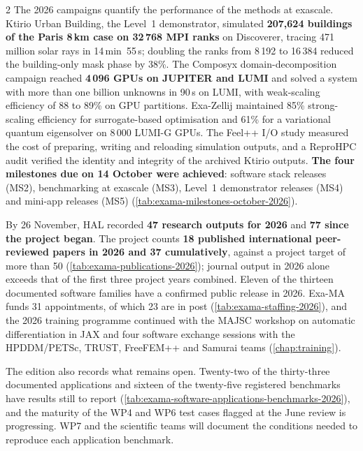 \begin{multicols}{2}
The 2026 campaigns quantify the performance of the methods at
exascale. Ktirio Urban Building, the Level~1 demonstrator, simulated
\textbf{207,624 buildings of the Paris 8\,km case on 32\,768 MPI
ranks} on Discoverer, tracing 471 million solar rays in 14\,min~55\,s;
doubling the ranks from 8\,192 to 16\,384 reduced the building-only
mask phase by 38\%. The Composyx domain-decomposition campaign
reached \textbf{4\,096 GPUs on JUPITER and LUMI} and solved a system
with more than one billion unknowns in 90\,s on LUMI, with
weak-scaling efficiency of 88 to 89\% on GPU partitions. Exa-Zellij
maintained 85\% strong-scaling efficiency for surrogate-based
optimisation and 61\% for a variational quantum eigensolver on
8\,000 LUMI-G GPUs. The Feel++ I/O study measured the cost of
preparing, writing and reloading simulation outputs, and a ReproHPC
audit verified the identity and integrity of the archived Ktirio
outputs. \textbf{The four milestones due on 14 October were achieved}:
software stack releases (MS2), benchmarking at exascale (MS3),
Level~1 demonstrator releases (MS4) and mini-app releases (MS5)
(\cref{tab:exama-milestones-october-2026}).

By 26 November, HAL recorded \textbf{47 research outputs for 2026}
and \textbf{77 since the project began}. The project counts
\textbf{18 published international peer-reviewed papers in 2026 and
37 cumulatively}, against a project target of more than 50
(\cref{tab:exama-publications-2026}); journal output in 2026 alone
exceeds that of the first three project years combined. Eleven of the
thirteen documented software families have a confirmed public release
in 2026. Exa-MA funds 31 appointments, of which 23 are in post
(\cref{tab:exama-staffing-2026}), and the 2026 training programme
continued with the MAJSC workshop on automatic differentiation in JAX
and four software exchange sessions with the HPDDM/PETSc, TRUST,
FreeFEM++ and Samurai teams (\cref{chap:training}).

The edition also records what remains open. Twenty-two of the
thirty-three documented applications and sixteen of the twenty-five
registered benchmarks have results still to report
(\cref{tab:exama-software-applications-benchmarks-2026}), and the
maturity of the WP4 and WP6 test cases flagged at the June review is
progressing. WP7 and the
scientific teams will document the conditions needed to reproduce
each application benchmark.

\end{multicols}
\endgroup
